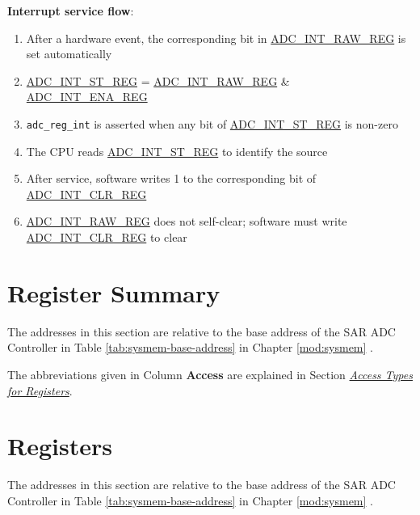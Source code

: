 \documentclass[main\_\_EN.tex]{subfiles}
\begin{document}
\textbf{Interrupt service flow}:
\begin{enumerate}
    \item After a hardware event, the corresponding bit in \hyperref[regdesc:ADCINTRAWREG]{ADC\_INT\_RAW\_REG} is set automatically
    \item \hyperref[regdesc:ADCINTSTREG]{ADC\_INT\_ST\_REG} = \hyperref[regdesc:ADCINTRAWREG]{ADC\_INT\_RAW\_REG} \& \hyperref[regdesc:ADCINTENAREG]{ADC\_INT\_ENA\_REG}
    \item \verb+adc_reg_int+ is asserted when any bit of \hyperref[regdesc:ADCINTSTREG]{ADC\_INT\_ST\_REG} is non-zero
    \item The CPU reads \hyperref[regdesc:ADCINTSTREG]{ADC\_INT\_ST\_REG} to identify the source
    \item After service, software writes 1 to the corresponding bit of \hyperref[regdesc:ADCINTCLRREG]{ADC\_INT\_CLR\_REG}
    \item \hyperref[regdesc:ADCINTRAWREG]{ADC\_INT\_RAW\_REG} does not self-clear; software must write \hyperref[regdesc:ADCINTCLRREG]{ADC\_INT\_CLR\_REG} to clear
\end{enumerate}


\section{Register Summary}
\label{sec:adc-reg-summ}

The addresses in this section are relative to the base address of the SAR ADC Controller in Table \ref{tab:sysmem-base-address} in Chapter \ref{mod:sysmem} \textit{}.

The abbreviations given in Column \textbf{Access} are explained in Section \hyperref[glossary-access-types]{\textit{Access Types for Registers}}.




\section{Registers}
\label{sec:adc-reg}

The addresses in this section are relative to the base address of the SAR ADC Controller in Table \ref{tab:sysmem-base-address} in Chapter \ref{mod:sysmem} \textit{}.


\end{document}
